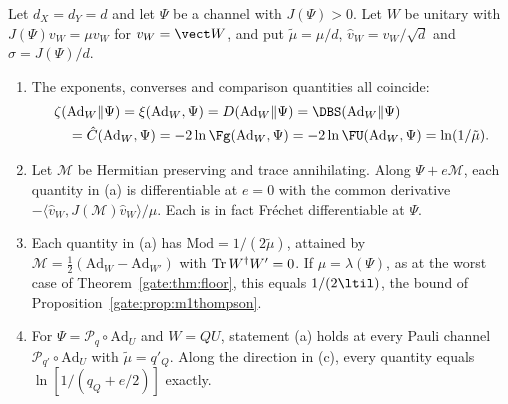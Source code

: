\begin{proposition}\label{gate:prop:m1worst}
Let $d_X=d_Y=d$ and let $\Psi$ be a channel with $J(\Psi)>0$. Let $W$ be unitary with $J(\Psi)v_W=\mu v_W$ for $v_W=\vect W$, and put $\tilde\mu=\mu/d$, $\hat v_W=v_W/\sqrt d$ and $\sigma=J(\Psi)/d$.
\begin{enumerate}
\item[(a)] The exponents, converses and comparison quantities all coincide:
\begin{equation*}
\begin{split}
&\zeta(\mathrm{Ad}_W\|\Psi)=\xi(\mathrm{Ad}_W,\Psi)=D(\mathrm{Ad}_W\|\Psi)=\DBS(\mathrm{Ad}_W\|\Psi)\\
&\quad=\hat C(\mathrm{Ad}_W,\Psi)=-2\ln\Fg(\mathrm{Ad}_W,\Psi)=-2\ln\FU(\mathrm{Ad}_W,\Psi)=\ln(1/\tilde\mu).
\end{split}
\end{equation*}
\item[(b)] Let $\mathcal M$ be Hermitian preserving and trace annihilating. Along $\Psi+e\mathcal M$, each quantity in (a) is differentiable at $e=0$ with the common derivative $-\langle\hat v_W,J(\mathcal M)\hat v_W\rangle/\mu$. Each is in fact Fr\'echet differentiable at $\Psi$.
\item[(c)] Each quantity in (a) has $\mathrm{Mod}=1/(2\tilde\mu)$, attained by $\mathcal M=\frac12(\mathrm{Ad}_W-\mathrm{Ad}_{W'})$ with $\operatorname{Tr} W^\dagger W'=0$. If $\mu=\lambda(\Psi)$, as at the worst case of Theorem~\ref{gate:thm:floor}, this equals $1/(2\ltil)$, the bound of Proposition~\ref{gate:prop:m1thompson}.
\item[(d)] For $\Psi=\mathcal P_q\circ\mathrm{Ad}_U$ and $W=QU$, statement (a) holds at every Pauli channel $\mathcal P_{q'}\circ\mathrm{Ad}_U$ with $\tilde\mu=q'_Q$. Along the direction in (c), every quantity equals $\ln[1/(q_Q+e/2)]$ exactly.
\end{enumerate}
\end{proposition}

